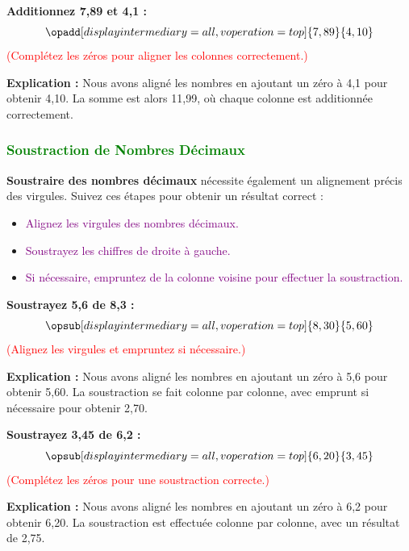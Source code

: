 \documentclass{article}
\begin{document}
\begin{tcolorbox}[colback=orange!10!white, colframe=orange!75!black, sharp corners=south, boxrule=0.8mm, title=Exemple d'Addition]
    \textbf{Additionnez 7,89 et 4,1 :}
    \[
    \opadd[displayintermediary=all,voperation=top]{7,89}{4,10}
    \]
    \textcolor{red}{(Complétez les zéros pour aligner les colonnes correctement.)}
    
    \textbf{Explication :} Nous avons aligné les nombres en ajoutant un zéro à 4,1 pour obtenir 4,10. La somme est alors 11,99, où chaque colonne est additionnée correctement.
\end{tcolorbox}

\subsubsection{\textcolor{green}{Soustraction de Nombres Décimaux}}

\vspace{0.25cm}

\textbf{Soustraire des nombres décimaux} nécessite également un alignement précis des virgules. Suivez ces étapes pour obtenir un résultat correct :

    \begin{itemize}
        \item \textcolor{purple}{Alignez les virgules des nombres décimaux.}
        \item \textcolor{purple}{Soustrayez les chiffres de droite à gauche.}
        \item \textcolor{purple}{Si nécessaire, empruntez de la colonne voisine pour effectuer la soustraction.}
    \end{itemize}

\vspace{0.2cm}

\begin{tcolorbox}[colback=orange!10!white, colframe=orange!75!black, sharp corners=south, boxrule=0.8mm, title=Exemple de Soustraction]
    \textbf{Soustrayez 5,6 de 8,3 :}
    \[
    \opsub[displayintermediary=all,voperation=top]{8,30}{5,60}
    \]
    \textcolor{red}{(Alignez les virgules et empruntez si nécessaire.)}
    
    \textbf{Explication :} Nous avons aligné les nombres en ajoutant un zéro à 5,6 pour obtenir 5,60. La soustraction se fait colonne par colonne, avec emprunt si nécessaire pour obtenir 2,70.
\end{tcolorbox}

\begin{tcolorbox}[colback=orange!10!white, colframe=orange!75!black, sharp corners=south, boxrule=0.8mm, title=Exemple de Soustraction]
    \textbf{Soustrayez 3,45 de 6,2 :}
    \[
    \opsub[displayintermediary=all,voperation=top]{6,20}{3,45}
    \]
    \textcolor{red}{(Complétez les zéros pour une soustraction correcte.)}
    
    \textbf{Explication :} Nous avons aligné les nombres en ajoutant un zéro à 6,2 pour obtenir 6,20. La soustraction est effectuée colonne par colonne, avec un résultat de 2,75.
\end{tcolorbox}
\end{document}
